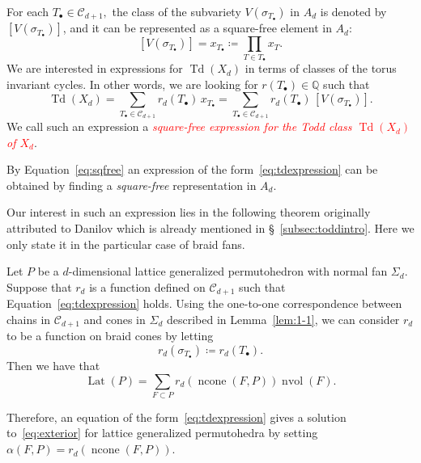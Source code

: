 \documentclass[ALCO,ThmDefs,Unicode,epreuves]{cedram}
\newcommand\Q{{\mathbb Q}}
\newcommand{\important}[1]{\emph{\textcolor{red}{#1}}}
\DeclareMathOperator{\Lat}{Lat}
\DeclareMathOperator{\nvol}{nvol}
\DeclareMathOperator{\ncone}{ncone}
\DeclareMathOperator{\td}{Td}
\newcommand{\CC}{\mathcal{C}}
\begin{document}
For each $T_\bullet \in \CC_{d+1},$ the class of the subvariety $V(\sigma_{T_{\bullet}})$ in $A_d$ is denoted by $[V(\sigma_{T_{\bullet}})]$, and it can be represented as a square-free element in $A_d:$ 
\begin{equation}\label{eq:sqfree}
[V(\sigma_{T_{\bullet}})] = x_{T_{\bullet}}\coloneqq \prod_{T\in T_{\bullet}} x_T.
\end{equation}
We are interested in expressions for $\td(X_d)$ in terms of classes of the torus invariant cycles. In other words, we are looking for $r(T_\bullet)\in\Q$ such that
\begin{equation}\label{eq:tdexpression}
\td(X_d) = \sum_{T_{\bullet}\in\CC_{d+1}} r_d(T_\bullet) \, x_{T_\bullet} = \sum_{T_{\bullet}\in\CC_{d+1}} r_d(T_\bullet) \, [V(\sigma_{T_{\bullet}})].
\end{equation}
We call such an expression a \important{square-free expression for the Todd class $\td(X_d)$ of $X_d$}.
\begin{rema}\label{rem:sqfree}
	By Equation~\eqref{eq:sqfree} an expression of the form~\eqref{eq:tdexpression} can be obtained by finding a \emph{square-free} representation in $A_d$.
\end{rema}

Our interest in such an expression lies in the following theorem originally attributed to Danilov which is already mentioned in \S~\ref{subsec:toddintro}. Here we only state it in the particular case of braid fans.


\begin{thm}\label{thm:dani}
	Let $P$ be a $d$-dimensional lattice generalized permutohedron with normal fan $\Sigma_d$. Suppose that $r_d$ is a function defined on $\CC_{d+1}$ such that Equation~\eqref{eq:tdexpression} holds. Using the one-to-one correspondence between chains in $\CC_{d+1}$ and cones in $\Sigma_d$ described in Lemma~\ref{lem:1-1}, we can consider $r_d$ to be a function on braid cones by letting 
	\[ r_d(\sigma_{T_\bullet}) \coloneqq r_d(T_\bullet).\]
	Then we have that
	\begin{equation}\label{eq:mcmullen}
	\Lat(P) = \sum_{F\subset P} r_{d}(\ncone(F,P)) \nvol(F).
	\end{equation}
\end{thm}
Therefore, an equation of the form~\eqref{eq:tdexpression} gives a solution to~\eqref{eq:exterior} for lattice generalized permutohedra by setting $\alpha(F,P)=r_d(\ncone(F,P))$.
\end{document}
